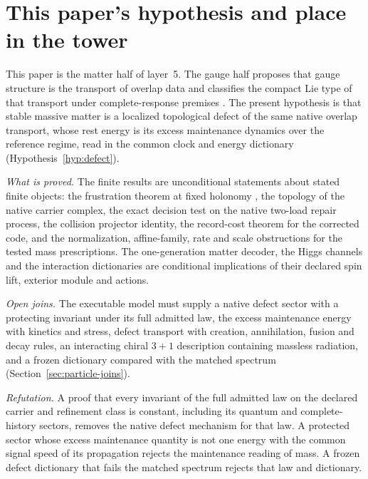 \documentclass[11pt]{article}
\begin{document}




\section*{This paper's hypothesis and place in the tower}
\label{sec:particle-hypothesis-place}

This paper is the matter half of layer~5. The gauge half proposes that gauge
structure is the transport of overlap data and classifies the compact Lie
type of that transport under complete-response premises \cite{ophGauge}.
The present hypothesis is that stable massive matter is a localized
topological defect of the same native overlap transport, whose rest energy
is its excess maintenance dynamics over the reference regime, read in the
common clock and energy dictionary (Hypothesis~\ref{hyp:defect}).

\emph{What is proved.} The finite results are unconditional statements
about stated finite objects: the frustration theorem at fixed holonomy
\cite{ophconsensus}, the topology of the native carrier complex, the exact
decision test on the native two-load repair process, the collision
projector identity, the record-cost theorem for the corrected code, and the
normalization, affine-family, rate and scale obstructions for the tested
mass prescriptions. The one-generation matter decoder, the Higgs channels
and the interaction dictionaries are conditional implications of their
declared spin lift, exterior module and actions.

\emph{Open joins.} The executable model must supply a native defect sector
with a protecting invariant under its full admitted law, the excess
maintenance energy with kinetics and stress, defect transport with
creation, annihilation, fusion and decay rules, an interacting chiral
\(3+1\) description containing massless radiation, and a frozen dictionary
compared with the matched spectrum (Section~\ref{sec:particle-joins}).

\emph{Refutation.} A proof that every invariant of the full admitted law on
the declared carrier and refinement class is constant, including its quantum
and complete-history sectors, removes the native defect mechanism for that
law. A protected sector whose excess maintenance quantity is not one energy
with the common signal speed of its propagation rejects the maintenance
reading of mass. A frozen defect dictionary that fails the matched spectrum
rejects that law and dictionary.
\end{document}
